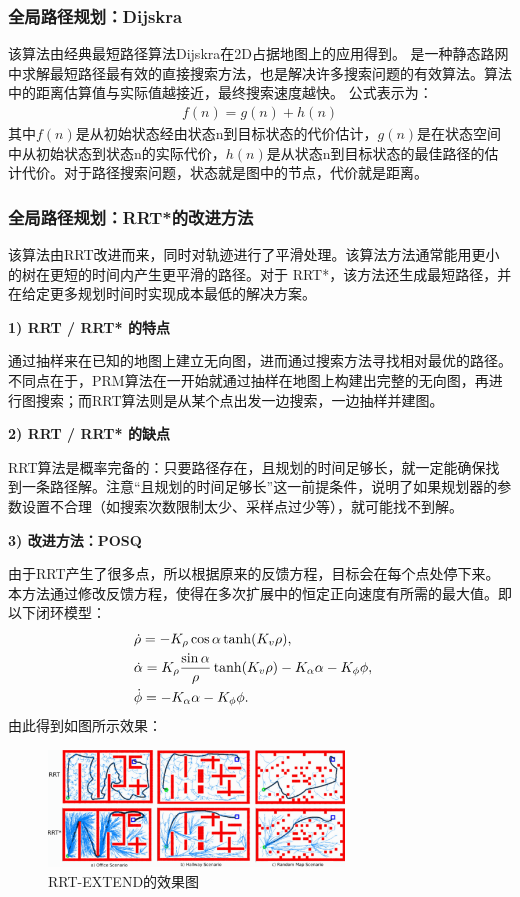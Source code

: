 \documentclass[cs4size,a4paper]{ctexart}
\numberwithin{equation}{section}
\numberwithin{table}{section}
\numberwithin{figure}{section}
\begin{document}
\subsubsection{全局路径规划：Dijskra}
该算法\cite{8784487}由经典最短路径算法Dijskra在2D占据地图上的应用得到。
是一种静态路网中求解最短路径最有效的直接搜索方法，也是解决许多搜索问题的有效算法。算法中的距离估算值与实际值越接近，最终搜索速度越快。 公式表示为：
\begin{align}
        f(n)=g(n)+h(n)
\end{align}
其中$f(n)$是从初始状态经由状态n到目标状态的代价估计，$g(n)$是在状态空间中从初始状态到状态n的实际代价，$h(n)$是从状态n到目标状态的最佳路径的估计代价。对于路径搜索问题，状态就是图中的节点，代价就是距离。

\subsubsection{全局路径规划：RRT*的改进方法}
该算法\cite{6942562}由RRT改进而来，同时对轨迹进行了平滑处理。该算法方法通常能用更小的树在更短的时间内产生更平滑的路径。对于 RRT*，该方法还生成最短路径，并在给定更多规划时间时实现成本最低的解决方案。

\textbf{1) RRT / RRT* 的特点}

通过抽样来在已知的地图上建立无向图，进而通过搜索方法寻找相对最优的路径。不同点在于，PRM算法在一开始就通过抽样在地图上构建出完整的无向图，再进行图搜索；而RRT算法则是从某个点出发一边搜索，一边抽样并建图。

\textbf{2) RRT / RRT* 的缺点}

RRT算法是概率完备的：只要路径存在，且规划的时间足够长，就一定能确保找到一条路径解。注意“且规划的时间足够长”这一前提条件，说明了如果规划器的参数设置不合理（如搜索次数限制太少、采样点过少等），就可能找不到解。

\textbf{3) 改进方法：POSQ}

由于RRT产生了很多点，所以根据原来的反馈方程，目标会在每个点处停下来。本方法通过修改反馈方程，使得在多次扩展中的恒定正向速度有所需的最大值。即以下闭环模型：
\begin{align}
        &\dot{\rho}=-K_{\rho}\cos\alpha\tanh(K_{v}\rho), \cr &\dot{\alpha}=K_{\rho}{\sin\alpha\over \rho}\tanh(K_{v}\rho)-K_{\alpha}\alpha-K_{\phi}\phi, \cr &\dot{\phi}=-K_{\alpha}\alpha-K_{\phi}\phi.
\end{align}
由此得到如图所示效果：
\begin{figure}[H]
        \centering
        \includegraphics[width=0.7\textwidth]{figure/rrt-extend.png}
        \caption{RRT-EXTEND的效果图}
\end{figure}
\end{document}
